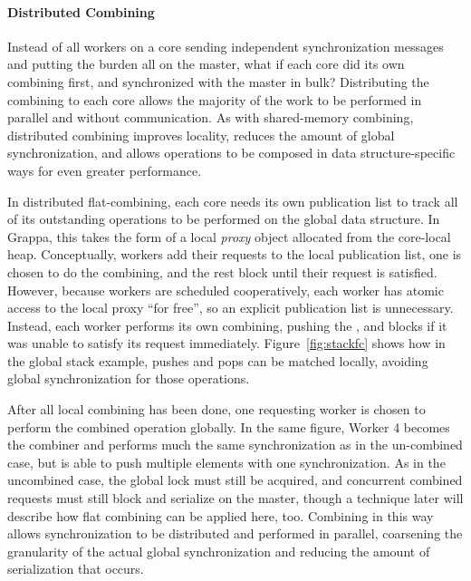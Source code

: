 \paragraph{Distributed Combining}
Instead of all workers on a core sending independent synchronization messages and putting the burden all on the master, what if each core did its own combining first, and synchronized with the master in bulk?
Distributing the combining to each core allows the majority of the work to be performed in parallel and without communication.
As with shared-memory combining, distributed combining improves locality, reduces the amount of global synchronization, and allows operations to be composed in data structure-specific ways for even greater performance.


In distributed flat-combining, each core needs its own publication list to track all of its outstanding operations to be performed on the global data structure. In Grappa, this takes the form of a local \emph{proxy} object allocated from the core-local heap.
Conceptually, workers add their requests to the local publication list, one is chosen to do the combining, and the rest block until their request is satisfied.
However, because workers are scheduled cooperatively, each worker has atomic access to the local proxy ``for free'', so an explicit publication list is unnecessary.
Instead, each worker performs its own combining, pushing the 
, and blocks if it was unable to satisfy its request immediately. Figure~\ref{fig:stackfc} shows how in the global stack example, pushes and pops can be matched locally, avoiding global synchronization for those operations.

After all local combining has been done, one requesting worker is chosen to perform the combined operation globally. In the same figure, Worker 4 becomes the combiner and performs much the same synchronization as in the un-combined case, but is able to push multiple elements with one synchronization. As in the uncombined case, the global lock must still be acquired, and concurrent combined requests must still block and serialize on the master, though a technique later will describe how flat combining can be applied here, too. Combining in this way allows synchronization to be distributed and performed in parallel, coarsening the granularity of the actual global synchronization and reducing the amount of serialization that occurs.

